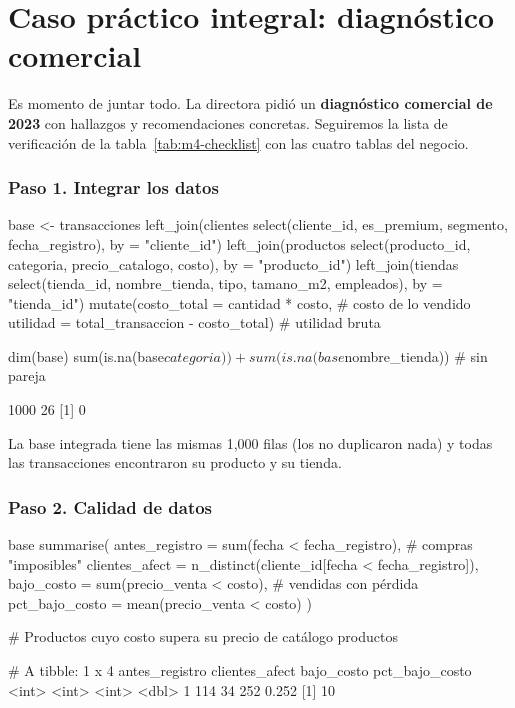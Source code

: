 \section{Caso práctico integral: diagnóstico comercial}
\label{sec:m4-caso}

Es momento de juntar todo. La directora pidió un \textbf{diagnóstico
comercial de 2023} con hallazgos y recomendaciones concretas. Seguiremos la
lista de verificación de la tabla~\ref{tab:m4-checklist} con las cuatro
tablas del negocio.

\subsubsection{Paso 1. Integrar los datos}

\begin{rcode}
base <- transacciones %
  left_join(clientes %
              select(cliente_id, es_premium, segmento, fecha_registro),
            by = "cliente_id") %
  left_join(productos %
              select(producto_id, categoria, precio_catalogo, costo),
            by = "producto_id") %
  left_join(tiendas %
              select(tienda_id, nombre_tienda, tipo, tamano_m2, empleados),
            by = "tienda_id") %
  mutate(costo_total = cantidad * costo,               # costo de lo vendido
         utilidad    = total_transaccion - costo_total)  # utilidad bruta

dim(base)
sum(is.na(base$categoria)) + sum(is.na(base$nombre_tienda))  # sin pareja
\end{rcode}
\begin{rsalida}
[1] 1000   26
[1] 0
\end{rsalida}

La base integrada tiene las mismas 1,000 filas (los  no
duplicaron nada) y todas las transacciones encontraron su producto y su
tienda.

\subsubsection{Paso 2. Calidad de datos}

\begin{rcode}
base %
  summarise(
    antes_registro  = sum(fecha < fecha_registro),   # compras "imposibles"
    clientes_afect  = n_distinct(cliente_id[fecha < fecha_registro]),
    bajo_costo      = sum(precio_venta < costo),     # vendidas con pérdida
    pct_bajo_costo  = mean(precio_venta < costo)
  )

# Productos cuyo costo supera su precio de catálogo
productos %
\end{rcode}
\begin{rsalida}
# A tibble: 1 x 4
  antes_registro clientes_afect bajo_costo pct_bajo_costo
           <int>          <int>      <int>          <dbl>
1            114             34        252          0.252
[1] 10
\end{rsalida}

